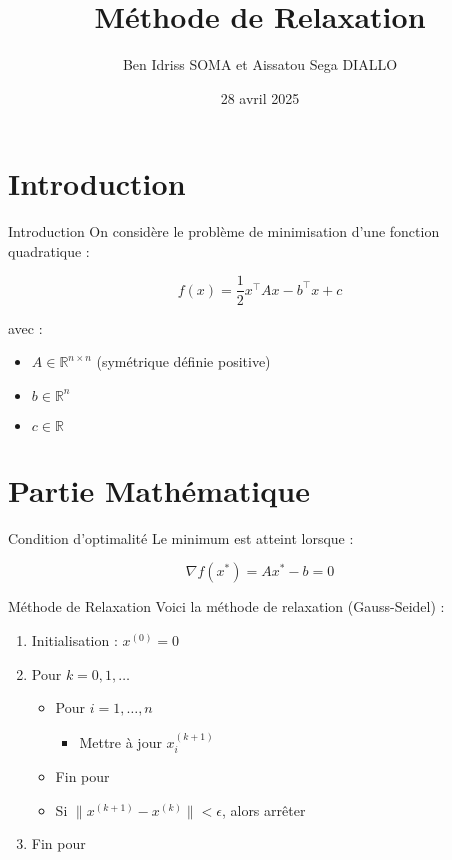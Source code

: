 \documentclass[
  ignorenonframetext,
]{beamer}
\title{Méthode de Relaxation}
\author{Ben Idriss SOMA et Aissatou Sega DIALLO}
\date{28 avril 2025}
\providecommand{\tightlist}{%
  \setlength{\itemsep}{0pt}\setlength{\parskip}{0pt}}
\begin{document}
\frame{\titlepage}

\section{Introduction}\label{introduction}

\begin{frame}{Introduction}
On considère le problème de minimisation d'une fonction quadratique :

\[
f(x) = \frac{1}{2} x^\top A x - b^\top x + c
\]

avec :

\begin{itemize}
\tightlist
\item
  \(A \in \mathbb{R}^{n \times n}\) (symétrique définie positive)
\item
  \(b \in \mathbb{R}^n\)
\item
  \(c \in \mathbb{R}\)
\end{itemize}
\end{frame}

\section{Partie Mathématique}\label{partie-mathuxe9matique}

\begin{frame}{Condition d'optimalité}
\label{condition-doptimalituxe9}
Le minimum est atteint lorsque :

\[
\nabla f(x^\ast) = A x^\ast - b = 0
\]
\end{frame}

\begin{frame}{Méthode de Relaxation}
\label{muxe9thode-de-relaxation}
Voici la méthode de relaxation (Gauss-Seidel) :

\begin{enumerate}
\tightlist
\item
  Initialisation : \(x^{(0)} = 0\)
\item
  Pour \(k = 0,1,\ldots\)

  \begin{itemize}
  \tightlist
  \item
    Pour \(i = 1, \ldots, n\)

    \begin{itemize}
    \tightlist
    \item
      Mettre à jour \(x_i^{(k+1)}\)
    \end{itemize}
  \item
    Fin pour
  \item
    Si \(\|x^{(k+1)} - x^{(k)}\| < \epsilon\), alors arrêter
  \end{itemize}
\item
  Fin pour
\end{enumerate}
\end{frame}
\end{document}
